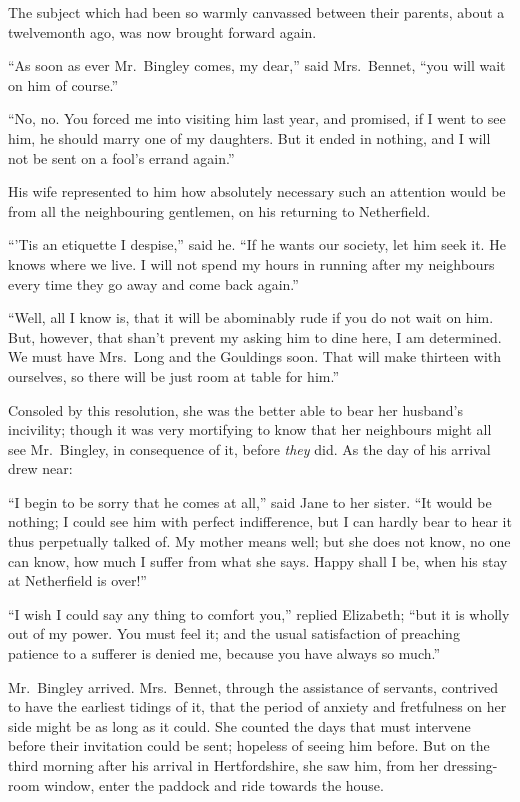 \documentclass[12pt,english,oneside]{book}
\begin{document}
The subject which had been so warmly canvassed between their parents,
about a twelvemonth ago, was now brought forward again.

{}``As soon as ever Mr.\ Bingley comes, my dear,'' said Mrs.\ Bennet,
{}``you will wait on him of course.''

{}``No, no. You forced me into visiting him last year, and promised,
if I went to see him, he should marry one of my daughters. But it
ended in nothing, and I will not be sent on a fool's errand again.''

His wife represented to him how absolutely necessary such an attention
would be from all the neighbouring gentlemen, on his returning to
Netherfield.

{}``'Tis an etiquette I despise,'' said he. {}``If he wants our
society, let him seek it. He knows where we live. I will not spend
my hours in running after my neighbours every time they go away and
come back again.''

{}``Well, all I know is, that it will be abominably rude if you do
not wait on him. But, however, that shan't prevent my asking him to
dine here, I am determined. We must have Mrs.\ Long and the Gouldings
soon. That will make thirteen with ourselves, so there will be just
room at table for him.''

Consoled by this resolution, she was the better able to bear her husband's
incivility; though it was very mortifying to know that her neighbours
might all see Mr.\ Bingley, in consequence of it, before \textit{they}
did. As the day of his arrival drew near:

{}``I begin to be sorry that he comes at all,'' said Jane to her
sister. {}``It would be nothing; I could see him with perfect indifference,
but I can hardly bear to hear it thus perpetually talked of. My mother
means well; but she does not know, no one can know, how much I suffer
from what she says. Happy shall I be, when his stay at Netherfield
is over!''\ 

{}``I wish I could say any thing to comfort you,'' replied Elizabeth;
{}``but it is wholly out of my power. You must feel it; and the usual
satisfaction of preaching patience to a sufferer is denied me, because
you have always so much.''

Mr.\ Bingley arrived. Mrs.\ Bennet, through the assistance of servants,
contrived to have the earliest tidings of it, that the period of anxiety
and fretfulness on her side might be as long as it could. She counted
the days that must intervene before their invitation could be sent;
hopeless of seeing him before. But on the third morning after his
arrival in Hertfordshire, she saw him, from her dressing-room window,
enter the paddock and ride towards the house.
\end{document}
